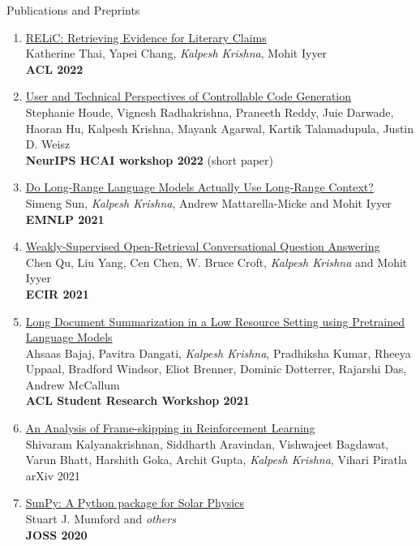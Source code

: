 \documentclass{resume} %
\begin{document}
\begin{rSection}{Publications and Preprints}
\begin{enumerate}[leftmargin=*]
\item \href{https://arxiv.org/abs/2203.10053}{RELiC: Retrieving Evidence for Literary Claims} \\
Katherine Thai, Yapei Chang, \textit{Kalpesh Krishna}, Mohit Iyyer \\
\textbf{ACL 2022}

\item \href{https://research.ibm.com/publications/user-and-technical-perspectives-of-controllable-code-generation}{User and Technical Perspectives of Controllable Code Generation} \\
Stephanie Houde, Vignesh Radhakrishna, Praneeth Reddy, Juie Darwade, Haoran Hu, Kalpesh Krishna, Mayank Agarwal, Kartik Talamadupula, Justin D. Weisz \\
\textbf{NeurIPS HCAI workshop 2022} (short paper)

\item \href{https://arxiv.org/abs/2109.09115}{Do Long-Range Language Models Actually Use Long-Range Context?} \\
Simeng Sun, \textit{Kalpesh Krishna}, Andrew Mattarella-Micke and Mohit Iyyer \\
\textbf{EMNLP 2021}

\item \href{https://arxiv.org/abs/2103.02537}{Weakly-Supervised Open-Retrieval Conversational Question Answering} \\
Chen Qu, Liu Yang, Cen Chen, W. Bruce Croft, \textit{Kalpesh Krishna} and Mohit Iyyer \\
\textbf{ECIR 2021}
\item \href{https://arxiv.org/abs/2103.00751}{Long Document Summarization in a Low Resource Setting using Pretrained Language Models} \\ Ahsaas Bajaj, Pavitra Dangati, \textit{Kalpesh Krishna}, Pradhiksha Kumar, Rheeya Uppaal, Bradford Windsor, Eliot Brenner, Dominic Dotterrer, Rajarshi Das, Andrew McCallum \\
\textbf{ACL Student Research Workshop 2021}
\item \href{https://arxiv.org/abs/2102.03718}{An Analysis of Frame-skipping in Reinforcement Learning} \\ Shivaram Kalyanakrishnan, Siddharth Aravindan, Vishwajeet Bagdawat, Varun Bhatt, Harshith Goka, Archit Gupta, \textit{Kalpesh Krishna}, Vihari Piratla \\
arXiv 2021

\item \href{https://joss.theoj.org/papers/10.21105/joss.01832}{SunPy: A Python package for Solar Physics} \\ Stuart J. Mumford and \textit{others} \\ \textbf{JOSS 2020}


\end{enumerate}
\end{rSection}
\end{document}
